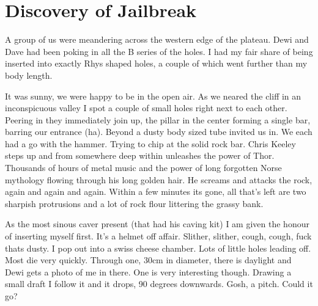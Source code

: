 \begin{marginfigure}
\end{marginfigure}

\section{Discovery of Jailbreak}
 
A group of us were meandering across the western edge of the plateau. Dewi and Dave had been poking in all the B series of the holes. I had my fair share of being inserted into exactly Rhys shaped holes, a couple of which went further than my body length.
 
It was sunny, we were happy to be in the open air. As we neared the cliff in an inconspicuous valley I spot a couple of small holes right next to each other. Peering in they immediately join up, the pillar in the center forming a single bar, barring our entrance (ha). Beyond a dusty body sized tube invited us in. 
We each had a go with the hammer. Trying to chip at the solid rock bar. Chris Keeley steps up and from somewhere deep within unleashes the power of Thor. Thousands of hours of metal music and the power of long forgotten Norse mythology flowing through his long golden hair. He screams and attacks the rock, again and again and again. Within a few minutes its gone, all that’s left are two sharpish protrusions and a lot of rock flour littering the grassy bank. 
 
As the most sinous caver present (that had his caving kit) I am given the honour of inserting myself first. It’s a helmet off affair. Slither, slither, cough, cough, fuck thats dusty. I pop out into a swiss cheese chamber. Lots of little holes leading off. Most die very quickly. Through one, 30cm in diameter, there is daylight and Dewi gets a photo of me in there. One is very interesting though. Drawing a small draft I follow it and it drops, 90 degrees downwards. Gosh, a pitch. Could it go?
 
